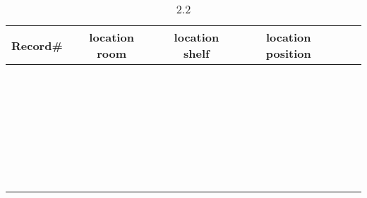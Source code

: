 \documentclass[]{article}
\begin{document}
			\begin{center}
			\begin{longtable}{|c|c|c|c|c|c|}
			\caption{2.2} \\ 
			\hline
			\hline
			Record\# & location room & location shelf & location position \\ 
			\hline
				\phantom{1} & & &  \\
			\hline
				\phantom{1} & & &  \\
			\hline
				\phantom{1} & & &  \\
			\hline
				\phantom{1} & & &  \\
			\hline
				\phantom{1} & & &  \\
			\hline
				\phantom{1} & & &  \\
			\hline
				\phantom{1} & & &  \\
			\hline
				\phantom{1} & & &  \\
			\hline
			\phantom{1} & & &  \\
			\hline
				\phantom{1} & & &  \\
			\hline
			\phantom{1} & & &  \\
			\hline
				\phantom{1} & & &  \\
			\hline
			\phantom{1} & & &  \\
			\hline
				\phantom{1} & & &  \\
			\hline
			\phantom{1} & & &  \\
			\hline
				\phantom{1} & & &  \\
			\hline
			\phantom{1} & & &  \\
			\hline
				\phantom{1} & & &  \\
			\hline
			\phantom{1} & & &  \\
			\hline
				\phantom{1} & & &  \\
			\hline
			\phantom{1} & & &  \\
			\hline
				\phantom{1} & & &  \\
			\hline
			\phantom{1} & & &  \\
			\hline
				\phantom{1} & & &  \\
			\hline
			\phantom{1} & & &  \\
			\hline
				\phantom{1} & & &  \\
			\hline
			\phantom{1} & & &  \\
			\hline
				\phantom{1} & & &  \\
			\hline
			\phantom{1} & & &  \\
			\hline
				\phantom{1} & & &  \\

\end{longtable}
\end{center}
\end{document}
